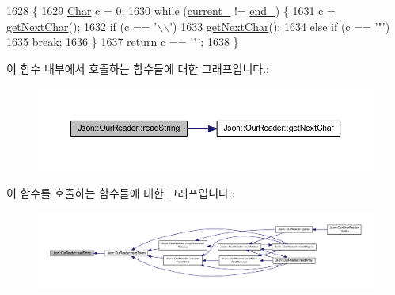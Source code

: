 \begin{DoxyCode}
1628                            \{
1629   \hyperlink{class_json_1_1_our_reader_a0cd0bab4caa66594ab843ccd5f9dc239}{Char} c = 0;
1630   \textcolor{keywordflow}{while} (\hyperlink{class_json_1_1_our_reader_a5211fbbba94be80a22dd2317c621efcc}{current\_} != \hyperlink{class_json_1_1_our_reader_ab1f69b0260c27a0d2d65dc56e42c8f9d}{end\_}) \{
1631     c = \hyperlink{class_json_1_1_our_reader_a298285d035fdbc554caae09d9f0a5859}{getNextChar}();
1632     \textcolor{keywordflow}{if} (c == \textcolor{charliteral}{'\(\backslash\)\(\backslash\)'})
1633       \hyperlink{class_json_1_1_our_reader_a298285d035fdbc554caae09d9f0a5859}{getNextChar}();
1634     \textcolor{keywordflow}{else} \textcolor{keywordflow}{if} (c == \textcolor{charliteral}{'"'})
1635       \textcolor{keywordflow}{break};
1636   \}
1637   \textcolor{keywordflow}{return} c == \textcolor{charliteral}{'"'};
1638 \}
\end{DoxyCode}
이 함수 내부에서 호출하는 함수들에 대한 그래프입니다.\+:\nopagebreak
\begin{figure}[H]
\begin{center}
\leavevmode
\includegraphics[width=350pt]{class_json_1_1_our_reader_a5d39b12671499ec5975f3bbc84b7d438_cgraph}
\end{center}
\end{figure}
이 함수를 호출하는 함수들에 대한 그래프입니다.\+:\nopagebreak
\begin{figure}[H]
\begin{center}
\leavevmode
\includegraphics[width=350pt]{class_json_1_1_our_reader_a5d39b12671499ec5975f3bbc84b7d438_icgraph}
\end{center}
\end{figure}
\mbox{\label{class_json_1_1_our_reader_ac78592defdc333faf56c6d0908758da3}} 
